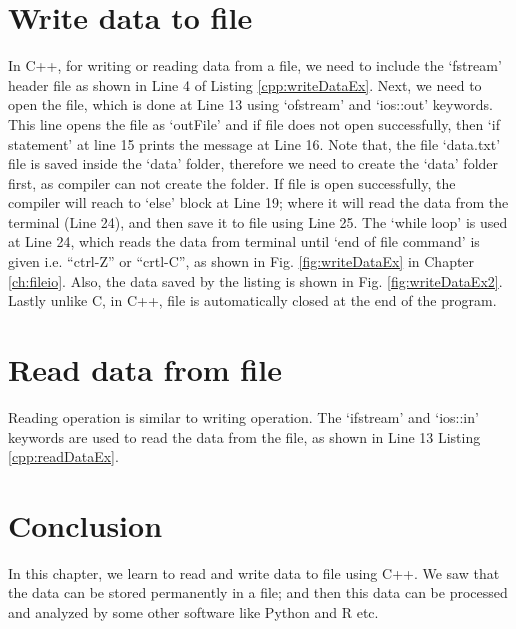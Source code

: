 \section{Write data to file}
In C++, for writing or reading data from a file, we need to include the `fstream' header file as shown in Line 4 of Listing \ref{cpp:writeDataEx}. Next, we need to open the file, which is done at Line 13 using `ofstream' and `ios::out' keywords. This line opens the file as `outFile' and if file does not open successfully, then `if statement' at line 15 prints the message at Line 16. Note that, the file `data.txt' file is saved inside the `data' folder, therefore we need to create the `data' folder first, as compiler can not create the folder. If file is open successfully, the compiler will reach to `else' block at Line 19; where it will read the data from the terminal (Line 24), and then save it to file using Line 25. The `while loop' is used at Line 24, which reads the data from terminal until `end of file command' is given i.e. ``ctrl-Z'' or ``crtl-C'', as shown in Fig. \ref{fig:writeDataEx} in Chapter \ref{ch:fileio}. Also, the data saved by the listing is shown in Fig. \ref{fig:writeDataEx2}. Lastly unlike C, in C++, file is automatically closed at the end of the program. 




\section{Read data from file}
Reading operation is similar to writing operation. The `ifstream' and `ios::in' keywords are used to read the data from the file, as shown in Line 13 Listing \ref{cpp:readDataEx}. 



\section{Conclusion}
In this chapter, we learn to read and write data to file using C++. We saw that the data can be stored  permanently in a file; and then this data can be processed and analyzed by some other software like Python and R etc. 
